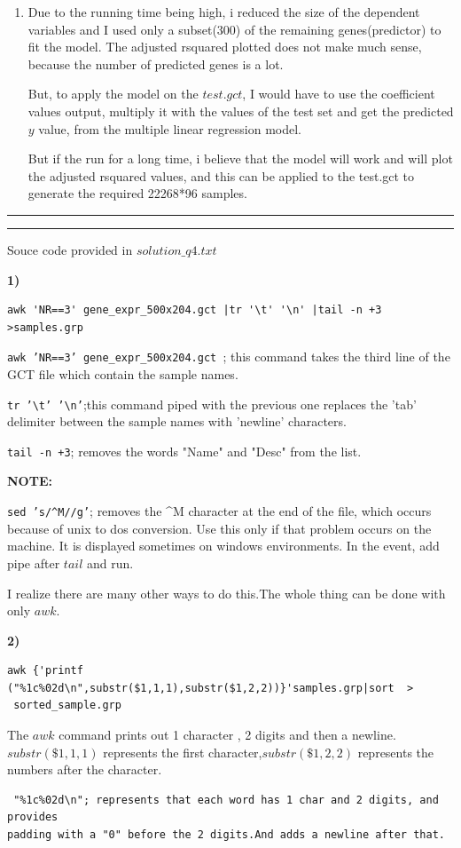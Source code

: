 \documentclass[11pt]{article}
\newcommand{\question}[2] {\vspace{.25in} \hrule\vspace{0.5em}
\noindent{\bf #1: #2} \vspace{0.5em}
\hrule \vspace{.10in}}
\begin{document}
\begin{enumerate}
\item

Due to the running time being high, i reduced the size of the dependent variables and I used only a subset(300) of the remaining genes(predictor) to fit the model. The adjusted rsquared plotted does not make much sense, because the number of predicted genes is a lot.

But, to apply the model on the $test.gct$, I would have to use the coefficient values output, multiply it with the values of the test set and get the predicted $y$ value, from the multiple linear regression model.

But if the run for a long time, i believe that the model will work and will plot the adjusted rsquared values, and this can be applied to the test.gct to generate the required 22268*96 samples.



\end{enumerate}


\question{4}{Shell Scripting}

Souce code provided in $solution\_q4.txt$

{\bf 1)}
\begin{verbatim}
awk 'NR==3' gene_expr_500x204.gct |tr '\t' '\n' |tail -n +3 >samples.grp 

\end{verbatim}

{\tt awk 'NR==3' gene\_expr\_500x204.gct }; this command takes the third line of the GCT file which contain the sample names.

{\tt tr '\textbackslash t' '\textbackslash n'};this command piped with the previous one replaces the 'tab' delimiter between the sample names with 'newline' characters.

{\tt tail -n +3}; removes the words "Name" and "Desc" from the list.


{\bf NOTE:}

{\tt sed 's/\textasciicircum M//g'}; removes the \textasciicircum M character at the end of the file, which occurs because of unix to dos conversion. Use this only if that problem occurs on the machine. It is displayed sometimes on windows environments. In the event, add pipe after $tail$ and run.

I realize there are many other ways to do this.The whole thing can be done with only $awk$.

{\bf 2)}
\begin{verbatim}
awk {'printf ("%1c%02d\n",substr($1,1,1),substr($1,2,2))}'samples.grp|sort  >
 sorted_sample.grp
\end{verbatim}

The $awk$ command prints out 1 character , 2 digits and then a newline.$substr(\$1,1,1)$ represents the first character,$substr(\$1,2,2)$ represents the numbers after the character.

\begin{verbatim}
 "%1c%02d\n"; represents that each word has 1 char and 2 digits, and provides 
padding with a "0" before the 2 digits.And adds a newline after that.
\end{verbatim}
\end{document}
